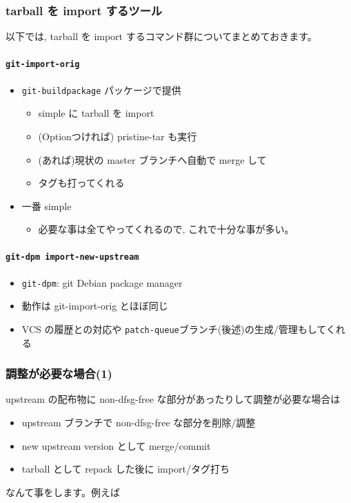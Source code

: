 \documentclass[mingoth,a4paper]{jsarticle}
\begin{document}
\subsubsection*{tarball を import するツール}

以下では, tarball を import するコマンド群についてまとめておきます。

\label{sec-2-6}
\paragraph{\texttt{git-import-orig}}
\label{sec-2-6-1}
\begin{itemize}
\item \texttt{git-buildpackage} パッケージで提供
  \begin{itemize}
  \item simple に tarball を import
  \item (Optionつければ) pristine-tar も実行
  \item (あれば)現状の master ブランチへ自動で merge して
  \item タグも打ってくれる
  \end{itemize}
\item 一番 simple
  \begin{itemize}
  \item 必要な事は全てやってくれるので, これで十分な事が多い。
  \end{itemize}
\end{itemize}
\label{sec-2-6-2}

\label{sec-2-7}
\paragraph{\texttt{git-dpm import-new-upstream}}
\label{sec-2-7-1}

\begin{itemize}
\item \texttt{git-dpm}: git Debian package manager
\item 動作は git-import-orig とほぼ同じ
\item VCS の履歴との対応や \texttt{patch-queue}ブランチ(後述)の生成/管理もしてくれる
\end{itemize}

\subsubsection*{調整が必要な場合(1)}
\label{sec-2-8}

upstream の配布物に non-dfsg-free な部分があったりして調整が必要な場合は
\begin{itemize}
\item upstream ブランチで non-dfsg-free な部分を削除/調整
\item new upstream version として merge/commit
\item tarball として repack した後に import/タグ打ち
\end{itemize}
なんて事をします。例えば
\end{document}
